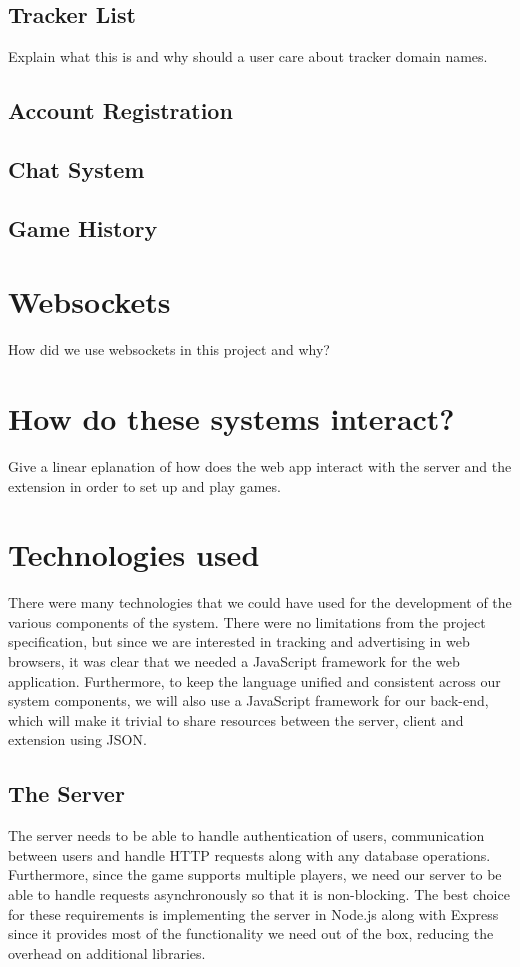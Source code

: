 \documentclass{l4proj}
\begin{document}
\subsection{Tracker List}
Explain what this is and why should a user care about tracker domain names.

\subsection{Account Registration}

\subsection{Chat System}

\subsection{Game History}

\section{Websockets}
How did we use websockets in this project and why?

\section{How do these systems interact?}
Give a linear eplanation of how does the web app interact with the server and the extension in order to set up and play games.

\section{Technologies used}
There were many technologies that we could have used for the development of the various components of the system. There were no limitations from the project specification, but since we are interested in tracking and 
advertising in web browsers, it was clear that we needed a JavaScript framework for the web application. Furthermore, to keep the language unified and consistent across our system components, we will also use a JavaScript framework for our
back-end, which will make it trivial to share resources between the server, client and extension using JSON. 

\subsection{The Server}
The server needs to be able to handle authentication of users, communication between users and handle HTTP requests along with any database operations. Furthermore, since the game supports multiple players, we need
our server to be able to handle requests asynchronously so that it is non-blocking. The best choice for these requirements is implementing the server in Node.js along with Express since it provides most of the functionality we need out of the box, reducing the overhead
on additional libraries.  
\end{document}
